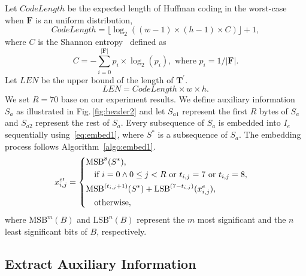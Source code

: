 \documentclass{elsarticle}
\begin{document}
	Let \(CodeLength\) be the expected length of Huffman coding in the worst-case when \(\mathbf{F}\) is an uniform distribution, 
	\begin{equation}
		\label{eq:floor}
		CodeLength = \lfloor \log_2((w - 1) \times (h - 1) \times C ) \rfloor + 1 , 
	\end{equation} 
	where \(C\) is the Shannon entropy~\cite{Shannon1948} defined as
	\begin{equation}
		C = - \sum_{i = 0}^{\vert \mathbf{F} \vert} p_i \times \log_2 (p_i), \text{ where } p_i = 1 / {\vert \mathbf{F} \vert}.
	\end{equation}
	Let \(LEN\) be the upper bound of the length of \(\mathbf{T^\prime}\).
	\begin{equation}
		\label{eq:len}
		LEN = CodeLength \times w \times h.
	\end{equation}
	We set \(R = 70\) base on our experiment results.
	We define auxiliary information \(S_a\) as illustrated in Fig.\,\ref{fig:header2} and let \(S_{a1}\) represent the first \(R\) bytes of \(S_a\) and \(S_{a2}\) represent the rest of \(S_a\). 
	Every subsequence of \(S_a\) is embedded into \(I_e\) sequentially using~\eqref{eq:embed1}, where \(S^\ast\) is a subsequence of \(S_a\). 
	The embedding process follows Algorithm~\ref{algo:embed1}.
	\begin{align}
		\label{eq:embed1}
		x^{e\prime}_{i, j}  &= 
		\begin{dcases}
			\mathrm{MSB}^8(S^\ast)                   , \\
			\quad \text{if }  i = 0 \wedge  0 \leq j < R \text{ or } t_{i, j} = 7 \text{ or } t_{i, j} = 8, \\
			\mathrm{MSB}^{(t_{i, j} + 1)}(S^\ast) + \mathrm{LSB}^{(7 - t_{i, j})}(x^e_{i, j}),  \\
			\quad \text{otherwise},
		\end{dcases}  
	\end{align}
	where \(\mathrm{MSB}^{m}(B)\) and \(\mathrm{LSB}^{n}(B)\) represent the \(m\) most significant and the \(n\) least significant bits of \(B\), respectively.
	
	
	\subsection{Extract Auxiliary Information}
	
\end{document}
